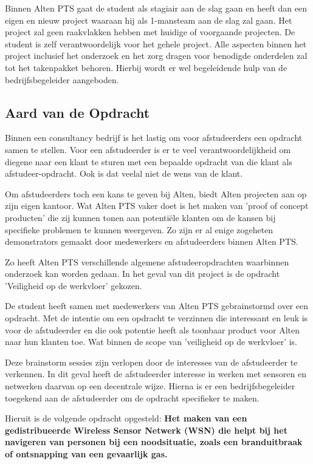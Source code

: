 \documentclass{../local}
\begin{document}
Binnen Alten PTS gaat de student als stagiair aan de slag gaan en heeft dan een eigen en nieuw project waaraan hij als 1-mansteam aan de slag zal gaan. Het project zal geen raakvlakken hebben met huidige of voorgaande projecten. De student is zelf verantwoordelijk voor het gehele project. Alle aspecten binnen het project inclusief het onderzoek en het zorg dragen voor benodigde onderdelen zal tot het takenpakket behoren. Hierbij wordt er wel begeleidende hulp van de bedrijfsbegeleider aangeboden.

\subsection{Aard van de Opdracht}

Binnen een consultancy bedrijf is het lastig om voor afstudeerders een opdracht samen te stellen. Voor een afstudeerder is er te veel verantwoordelijkheid om diegene naar een klant te sturen met een bepaalde opdracht van die klant als afstudeer-opdracht. Ook is dat veelal niet de wens van de klant. 

Om afstudeerders toch een kans te geven bij Alten, biedt Alten projecten aan op zijn eigen kantoor. Wat Alten PTS vaker doet is het maken van 'proof of concept producten' die zij kunnen tonen aan potentiële klanten om de kansen bij specifieke problemen te kunnen weergeven. Zo zijn er al enige zogeheten demonstrators gemaakt door medewerkers en afstudeerders binnen Alten PTS.

Zo heeft Alten PTS verschillende algemene afstudeeropdrachten waarbinnen onderzoek kan worden gedaan. In het geval van dit project is de opdracht 'Veiligheid op de werkvloer' gekozen.

De student heeft samen met medewerkers van Alten PTS gebrainstormd over een opdracht. Met de intentie om een opdracht te verzinnen die interessant en leuk is voor de afstudeerder en die ook potentie heeft als toonbaar product voor Alten naar hun klanten toe. Wat binnen de scope van 'veiligheid op de werkvloer' is.

Deze brainstorm sessies zijn verlopen door de interesses van de afstudeerder te verkennen. In dit geval heeft de afstudeerder interesse in werken met sensoren en netwerken daarvan op een decentrale wijze. Hierna is er een bedrijfsbegeleider toegekend aan de afstudeerder om de opdracht specifieker te maken.


Hieruit is de volgende opdracht opgesteld: 	
\textbf{
Het maken van een gedistribueerde Wireless Sensor Netwerk (WSN) die helpt bij het navigeren van personen bij een noodsituatie, zoals een branduitbraak of ontsnapping van een gevaarlijk gas.
}
\end{document}
